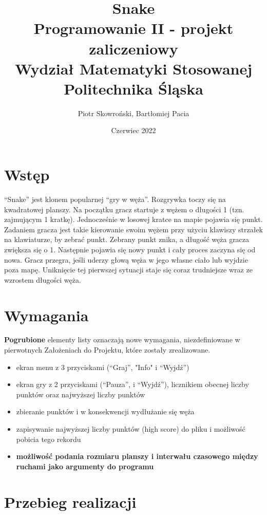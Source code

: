 \documentclass[12pt]{article}
\title{%
    Snake \\
    \large Programowanie II - projekt zaliczeniowy \\
    Wydział Matematyki Stosowanej \\
    Politechnika Śląska \\}
\author{Piotr Skowroński, Bartłomiej Pacia}
\date{Czerwiec 2022}
\begin{document}
\maketitle

\section{Wstęp}

“Snake” jest klonem popularnej “gry w węża”. Rozgrywka toczy się na kwadratowej
planszy. Na początku gracz startuje z wężem o długości 1 (tzn. zajmującym 1
kratkę). Jednocześnie w losowej kratce na mapie pojawia się punkt. Zadaniem
gracza jest takie kierowanie swoim wężem przy użyciu klawiszy strzałek na
klawiaturze, by zebrać punkt. Zebrany punkt znika, a długość węża gracza
zwiększa się o 1. Następnie pojawia się nowy punkt i cały proces zaczyna się od
nowa. Gracz przegra, jeśli uderzy głową węża w jego własne ciało lub wyjdzie
poza mapę. Uniknięcie tej pierwszej sytuacji staje się coraz trudniejsze wraz ze
wzrostem długości węża.

\section{Wymagania}

\textbf{Pogrubione} elementy listy oznaczają nowe wymagania, niezdefiniowane w
pierwotnych Założeniach do Projektu, które zostały zrealizowane.
\begin{itemize}
    \item ekran menu z 3 przyciskami (“Graj”, "Info" i “Wyjdź”)

    \item ekran gry z 2 przyciskami (“Pauza”, i “Wyjdź”), licznikiem
          obecnej liczby punktów oraz najwyższej liczby punktów

    \item zbieranie punktów i w konsekwencji wydłużanie się węża

    \item zapisywanie najwyższej liczby punktów (high score) do pliku i
          możliwość pobicia tego rekordu

    \item \textbf{możliwość podania rozmiaru planszy i interwału czasowego
              między ruchami jako argumenty do programu}

\end{itemize}


\section{Przebieg realizacji}
\end{document}
